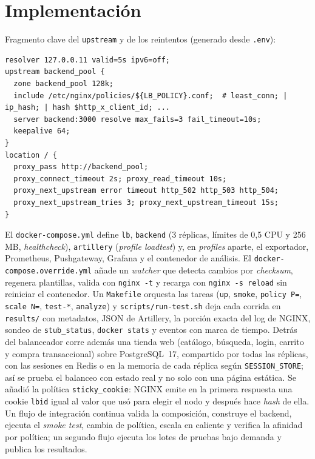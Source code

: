 \documentclass[conference]{IEEEtran}
\begin{document}
\section{Implementación}
Fragmento clave del \texttt{upstream} y de los reintentos (generado desde \texttt{.env}):
\begin{lstlisting}
resolver 127.0.0.11 valid=5s ipv6=off;
upstream backend_pool {
  zone backend_pool 128k;
  include /etc/nginx/policies/${LB_POLICY}.conf;  # least_conn; | ip_hash; | hash $http_x_client_id; ...
  server backend:3000 resolve max_fails=3 fail_timeout=10s;
  keepalive 64;
}
location / {
  proxy_pass http://backend_pool;
  proxy_connect_timeout 2s; proxy_read_timeout 10s;
  proxy_next_upstream error timeout http_502 http_503 http_504;
  proxy_next_upstream_tries 3; proxy_next_upstream_timeout 15s;
}
\end{lstlisting}
El \texttt{docker-compose.yml} define \texttt{lb}, \texttt{backend} (3 réplicas, límites de 0,5 CPU y 256\,MB, \emph{healthcheck}), \texttt{artillery} (\emph{profile loadtest}) y, en \emph{profiles} aparte, el exportador, Prometheus, Pushgateway, Grafana y el contenedor de análisis. El \texttt{docker-compose.override.yml} añade un \emph{watcher} que detecta cambios por \emph{checksum}, regenera plantillas, valida con \texttt{nginx -t} y recarga con \texttt{nginx -s reload} sin reiniciar el contenedor. Un \texttt{Makefile} orquesta las tareas (\texttt{up}, \texttt{smoke}, \texttt{policy P=}, \texttt{scale N=}, \texttt{test-*}, \texttt{analyze}) y \texttt{scripts/run-test.sh} deja cada corrida en \texttt{results/} con metadatos, JSON de Artillery, la porción exacta del log de NGINX, sondeo de \texttt{stub\_status}, \texttt{docker stats} y eventos con marca de tiempo. Detrás del balanceador corre además una tienda web (catálogo, búsqueda, login, carrito y compra transaccional) sobre PostgreSQL~17, compartido por todas las réplicas, con las sesiones en Redis o en la memoria de cada réplica según \texttt{SESSION\_STORE}; así se prueba el balanceo con estado real y no solo con una página estática. Se añadió la política \texttt{sticky\_cookie}: NGINX emite en la primera respuesta una cookie \texttt{lbid} igual al valor que usó para elegir el nodo y después hace \emph{hash} de ella. Un flujo de integración continua valida la composición, construye el backend, ejecuta el \emph{smoke test}, cambia de política, escala en caliente y verifica la afinidad por política; un segundo flujo ejecuta los lotes de pruebas bajo demanda y publica los resultados.
\end{document}
